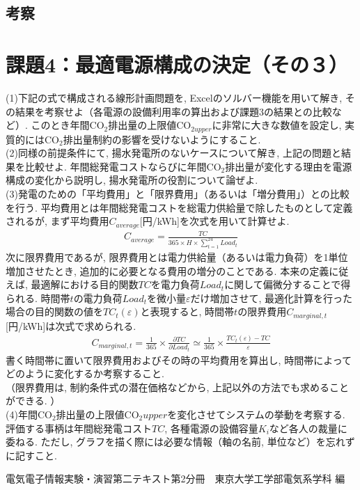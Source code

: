 \documentclass[]{jsarticle}
\begin{document}
  \subsection{考察}


\section{課題4：最適電源構成の決定（その３）}
  \begin{screen}
    (1)下記の式で構成される線形計画問題を, Excelのソルバー機能を用いて解き, その結果を考察せよ（各電源の設備利用率の算出および課題3の結果との比較など）. このとき年間CO$_2$排出量の上限値CO$_{2upper}$に非常に大きな数値を設定し, 実質的にはCO$_2$排出量制約の影響を受けないようにすること. \\
    (2)同様の前提条件にて, 揚水発電所のないケースについて解き, 上記の問題と結果を比較せよ. 年間総発電コストならびに年間CO$_2$排出量が変化する理由を電源構成の変化から説明し, 揚水発電所の役割について論ぜよ. \\
    (3)発電のための「平均費用」と「限界費用」（あるいは「増分費用」）との比較を行う. 平均費用とは年間総発電コストを総電力供給量で除したものとして定義されるが, まず平均費用$C_{average}$[円/kWh]を次式を用いて計算せよ.
      \begin{eqnarray}
        C_{average} = \frac{TC}{365 \times H \times \sum_{t = 1}^{24} Load_t}
      \end{eqnarray}
    次に限界費用であるが, 限界費用とは電力供給量（あるいは電力負荷）を1単位増加させたとき, 追加的に必要となる費用の増分のことである. 本来の定義に従えば, 最適解における目的関数$TC$を電力負荷$Load_t$に関して偏微分することで得られる. 時間帯$t$の電力負荷$Load_t$を微小量$\varepsilon$だけ増加させて, 最適化計算を行った場合の目的関数の値を$TC_t(\varepsilon)$と表現すると, 時間帯$t$の限界費用$C_{marginal,t}$[円/kWh]は次式で求められる.
      \begin{eqnarray}
        C_{marginal,t} = \frac{1}{365} \times \frac{\partial TC}{\partial Load_t} \simeq \frac{1}{365} \times \frac{TC_t(\varepsilon)-TC}{\varepsilon}
      \end{eqnarray}
    書く時間帯に置いて限界費用およびその時の平均費用を算出し, 時間帯によってどのように変化するか考察すること. \\
    （限界費用は, 制約条件式の潜在価格などから, 上記以外の方法でも求めることができる. ）\\
    (4)年間CO$_2$排出量の上限値CO$_2upper$を変化させてシステムの挙動を考察する. 評価する事柄は年間総発電コスト$TC$, 各種電源の設備容量$K_i$など各人の裁量に委ねる. ただし, グラフを描く際には必要な情報（軸の名前, 単位など）を忘れずに記すこと.
  \end{screen}




  \begin{thebibliography}{9}
     電気電子情報実験・演習第二テキスト第2分冊　東京大学工学部電気系学科 編
  \end{thebibliography}
\end{document}
